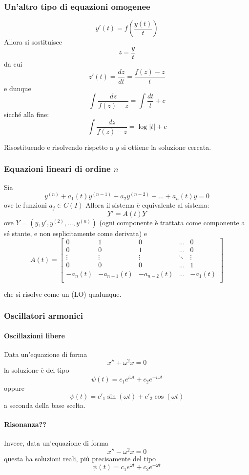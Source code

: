 \documentclass[a4paper,12pt]{article}
\begin{document}
\subsubsection{Un'altro tipo di equazioni omogenee}
$$y'(t) = f\left(\dfrac{y(t)}{t}\right)$$
Allora si sostituisce
$$z=\dfrac{y}{t}$$
da cui $$z'(t) = \dfrac{dz}{dt} = \dfrac{f(z)-z}{t}$$
e dunque
$$\int\dfrac{dz}{f(z)-z}=\int \dfrac{dt}{t} + c$$
sicché alla fine:
$$\int\dfrac{dz}{f(z)-z} = \log|t| + c$$

Risostituendo e risolvendo rispetto a $y$ si ottiene la soluzione cercata.

\subsubsection{Equazioni lineari di ordine $n$}
Sia
$$y^{(n)} + a_1(t)y^{(n-1)} + a_2y^{(n-2)} + ... + a_n(t)y = 0$$
ove le funzioni $a_j \in C(I)$
Allora il sistema è equivalente al sistema:
$$\underbar{Y}' = A(t)\underbar{Y}$$
ove $\underbar{Y}=(y, y', y^{(2)}, ..., y^{(n)})$ (ogni componente è trattata come componente a sé stante, e non esplicitamente come derivata) e
$$A(t) =
\begin{bmatrix}
0 & 1 & 0 & ... & 0\\
0 & 0 & 1 & ... & 0\\
\vdots & \vdots & \vdots & \ddots & \vdots \\
0 & 0 & 0 & ... & 1 \\
-a_n(t) & -a_{n-1}(t) & -a_{n-2}(t) & ... & -a_{1}(t) \\
\end{bmatrix}
$$

che si risolve come un (LO) qualunque.

\subsubsection{Oscillatori armonici}
\paragraph{Oscillazioni libere}
Data un'equazione di forma
$$x''+\omega^2 x=0$$
la soluzione è del tipo
$$\psi(t) = c_1 e^{i\omega t} + c_2 e^{-i\omega t}$$
oppure
$$\psi(t) = c'_1\sin(\omega t) + c'_2\cos(\omega t)$$
a seconda della base scelta.

\paragraph{Risonanza??}
Invece, data un'equazione di forma
$$x''-\omega^2 x=0$$
questa ha soluzioni reali, più precisamente del tipo
$$\psi(t) = c_1 e^{\omega t} + c_2 e^{-\omega t}$$
\end{document}
